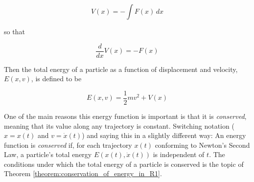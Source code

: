 \documentclass{article}
\theoremstyle{definition}
\begin{document}
\begin{equation}
V(x) = - \int F(x) \, dx
\label{eqn:V(x)}
\end{equation}

\noindent
so that 

\begin{equation}
\dfrac{d}{dx}V(x) = -F(x)
\label{eqn:F}
\end{equation}

\bigskip
\noindent
Then the total energy of a particle as a function of displacement and 
velocity, $E(x,v)$, is defined to be 

\begin{equation}
E(x,v) = \dfrac{1}{2}mv^{2} + V(x)
\label{eqn:E(x,v)}
\end{equation}

\medskip
\noindent
One of the main reasons this energy function is important is that it is 
\emph{conserved}, meaning that its value along any trajectory is constant.
Switching notation ($x = x(t)$ and $v = \dot{x}(t)$) and saying this in 
a slightly different way: An energy function is \emph{conserved} if, for 
each trajectory $x(t)$ conforming to Newton’s Second Law, a particle's 
total energy $E(x(t),\dot{x}(t))$ is independent of $t$. The conditions
under which the total energy of a particle is conserved is the topic of 
Theorem \ref{theorem:conservation_of_energy_in_R1}.
\end{document}
